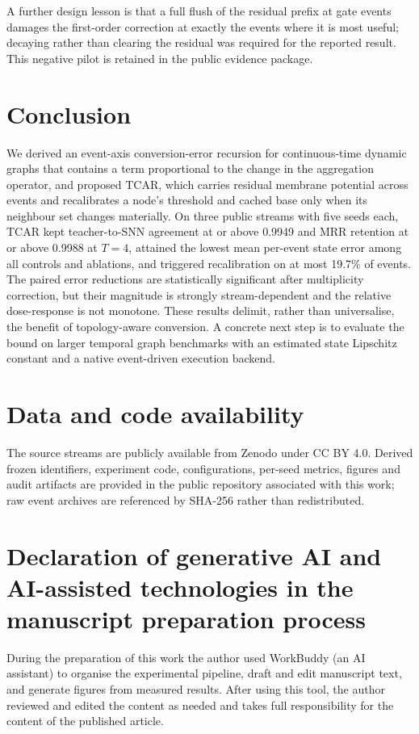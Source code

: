 \documentclass[preprint,12pt]{elsarticle}
\begin{document}
A further design lesson is that a full flush of the residual prefix at gate events damages the first-order correction at exactly the events where it is most useful; decaying rather than clearing the residual was required for the reported result. This negative pilot is retained in the public evidence package.

\section{Conclusion}
\label{sec:conclusion}

We derived an event-axis conversion-error recursion for continuous-time dynamic graphs that contains a term proportional to the change in the aggregation operator, and proposed TCAR, which carries residual membrane potential across events and recalibrates a node's threshold and cached base only when its neighbour set changes materially. On three public streams with five seeds each, TCAR kept teacher-to-SNN agreement at or above 0.9949 and MRR retention at or above 0.9988 at $T=4$, attained the lowest mean per-event state error among all controls and ablations, and triggered recalibration on at most 19.7\% of events. The paired error reductions are statistically significant after multiplicity correction, but their magnitude is strongly stream-dependent and the relative dose-response is not monotone. These results delimit, rather than universalise, the benefit of topology-aware conversion. A concrete next step is to evaluate the bound on larger temporal graph benchmarks with an estimated state Lipschitz constant and a native event-driven execution backend.

\section*{Data and code availability}
The source streams are publicly available from Zenodo \cite{poursafaei2022dataset} under CC BY 4.0. Derived frozen identifiers, experiment code, configurations, per-seed metrics, figures and audit artifacts are provided in the public repository associated with this work; raw event archives are referenced by SHA-256 rather than redistributed.

\section*{Declaration of generative AI and AI-assisted technologies in the manuscript preparation process}
During the preparation of this work the author used WorkBuddy (an AI assistant) to organise the experimental pipeline, draft and edit manuscript text, and generate figures from measured results. After using this tool, the author reviewed and edited the content as needed and takes full responsibility for the content of the published article.



\end{document}
